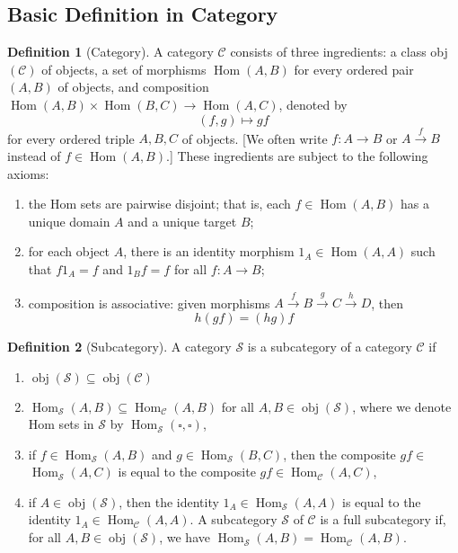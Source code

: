 \documentclass[a4paper,12pt]{article}
\theoremstyle{definition}
\newtheorem{defn}{Definition}[subsection]
\begin{document}
\subsection{Basic Definition in Category}
\begin{defn}[Category]
    A category $\mathcal{C}$ consists of three ingredients: a class obj $(\mathcal{C})$ of objects, a set of morphisms $\operatorname{Hom}(A, B)$ for every ordered pair $(A, B)$ of objects, and composition $\operatorname{Hom}(A, B) \times \operatorname{Hom}(B, C) \rightarrow \operatorname{Hom}(A, C)$, denoted by
    $$
        (f, g) \mapsto g f
    $$
    for every ordered triple $A, B, C$ of objects. [We often write $f: A \rightarrow B$ or $A \stackrel{f}{\rightarrow} B$ instead of $f \in \operatorname{Hom}(A, B)$.] These ingredients are subject to the following axioms:
    \begin{enumerate}[(1)]
        \item the Hom sets are pairwise disjoint; that is, each $f \in \operatorname{Hom}(A, B)$ has a unique domain $A$ and a unique target $B$;
        \item for each object $A$, there is an identity morphism $1_A \in \operatorname{Hom}(A, A)$ such that $f 1_A=f$ and $1_B f=f$ for all $f: A \rightarrow B$;
        \item composition is associative: given morphisms $A \stackrel{f}{\rightarrow} B \stackrel{g}{\rightarrow} C \stackrel{h}{\rightarrow} D$, then
              $$
                  h(g f)=(h g) f
              $$
    \end{enumerate}
\end{defn}
\begin{defn}[Subcategory]
    A category $\mathcal{S}$ is a subcategory of a category $\mathcal{C}$ if
    \begin{enumerate}[(1)]
        \item  $\operatorname{obj}(\mathcal{S}) \subseteq \operatorname{obj}(\mathcal{C})$
        \item  $\operatorname{Hom}_{\mathcal{S}}(A, B) \subseteq \operatorname{Hom}_{\mathcal{C}}(A, B)$ for all $A, B \in \operatorname{obj}(\mathcal{S})$, where we denote Hom sets in $\mathcal{S}$ by $\operatorname{Hom}_{\mathcal{S}}(\square, \square)$,
        \item  if $f \in \operatorname{Hom}_{\mathcal{S}}(A, B)$ and $g \in \operatorname{Hom}_{\mathcal{S}}(B, C)$, then the composite $g f \in$ $\operatorname{Hom}_{\mathcal{S}}(A, C)$ is equal to the composite $g f \in \operatorname{Hom}_{\mathcal{C}}(A, C)$,
        \item if $A \in \operatorname{obj}(\mathcal{S})$, then the identity $1_A \in \operatorname{Hom}_{\mathcal{S}}(A, A)$ is equal to the identity $1_A \in \operatorname{Hom}_{\mathcal{C}}(A, A)$.
              A subcategory $\mathcal{S}$ of $\mathcal{C}$ is a full subcategory if, for all $A, B \in \operatorname{obj}(\mathcal{S})$, we have $\operatorname{Hom}_{\mathcal{S}}(A, B)=\operatorname{Hom}_{\mathcal{C}}(A, B)$.
    \end{enumerate}
\end{defn}
\end{document}

